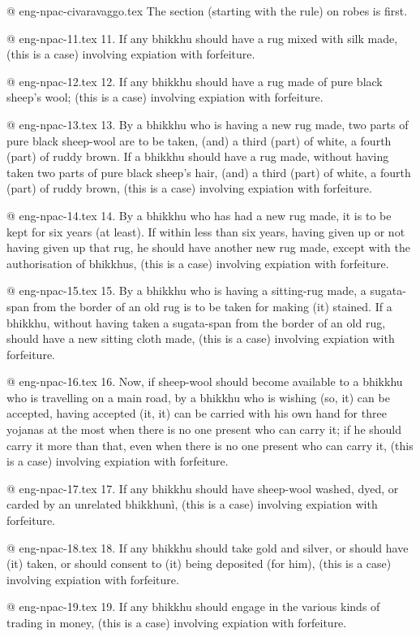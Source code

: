 @ eng-npac-civaravaggo.tex
The section (starting with the rule) on robes is first.

@ eng-npac-11.tex
11. If any bhikkhu should have a rug mixed with silk made, (this is a case) involving expiation with forfeiture.

@ eng-npac-12.tex
12. If any bhikkhu should have a rug made of pure black sheep's wool; (this is a case) involving expiation with forfeiture.

@ eng-npac-13.tex
13. By a bhikkhu who is having a new rug made, two parts of pure black sheep-wool are to be taken, (and) a third (part) of white, a fourth (part) of ruddy brown. If a bhikkhu should have a rug made, without having taken two parts of pure black sheep's hair, (and) a third (part) of white, a fourth (part) of ruddy brown, (this is a case) involving expiation with forfeiture.

@ eng-npac-14.tex
14. By a bhikkhu who has had a new rug made, it is to be kept for six years (at least). If within less than six years, having given up or not having given up that rug, he should have another new rug made, except with the authorisation of bhikkhus, (this is a case) involving expiation with forfeiture.

@ eng-npac-15.tex
15. By a bhikkhu who is having a sitting-rug made, a sugata-span from the border of an old rug is to be taken for making (it) stained. If a bhikkhu, without having taken a sugata-span from the border of an old rug, should have a new sitting cloth made, (this is a case) involving expiation with forfeiture.

@ eng-npac-16.tex
16. Now, if sheep-wool should become available to a bhikkhu who is travelling on a main road, by a bhikkhu who is wishing (so, it) can be accepted, having accepted (it, it) can be carried with his own hand for three yojanas at the most when there is no one present who can carry it; if he should carry it more than that, even when there is no one present who can carry it, (this is a case) involving expiation with forfeiture.

@ eng-npac-17.tex
17. If any bhikkhu should have sheep-wool washed, dyed, or carded by an unrelated bhikkhunì, (this is a case) involving expiation with forfeiture.

@ eng-npac-18.tex
18. If any bhikkhu should take gold and silver, or should have (it) taken, or should consent to (it) being deposited (for him), (this is a case) involving expiation with forfeiture.

@ eng-npac-19.tex
19. If any bhikkhu should engage in the various kinds of trading in money, (this is a case) involving expiation with forfeiture.

